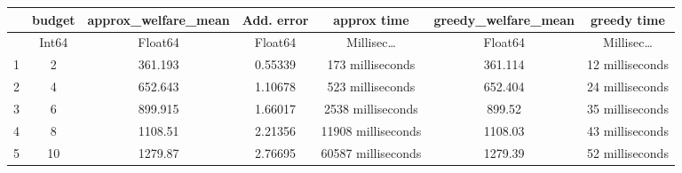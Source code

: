 \begin{tabular}{r|cccccc}
	& budget & approx\_welfare\_mean & Add. error & approx time & greedy\_welfare\_mean & greedy time\\
	\hline
	& Int64 & Float64 & Float64 & Millisec… & Float64 & Millisec…\\
	\hline
	1 & 2 & 361.193 & 0.55339 & 173 milliseconds & 361.114 & 12 milliseconds \\
	2 & 4 & 652.643 & 1.10678 & 523 milliseconds & 652.404 & 24 milliseconds \\
	3 & 6 & 899.915 & 1.66017 & 2538 milliseconds & 899.52 & 35 milliseconds \\
	4 & 8 & 1108.51 & 2.21356 & 11908 milliseconds & 1108.03 & 43 milliseconds \\
	5 & 10 & 1279.87 & 2.76695 & 60587 milliseconds & 1279.39 & 52 milliseconds \\
\end{tabular}
